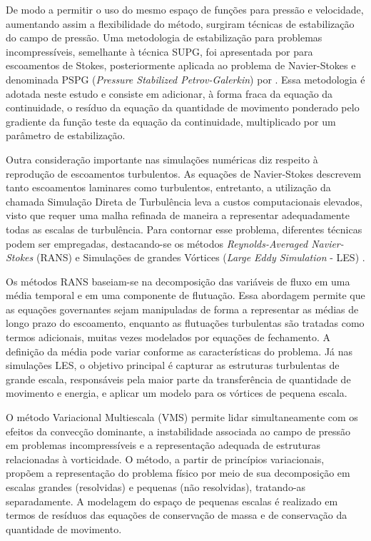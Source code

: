 De modo a permitir o uso do mesmo espaço de funções para pressão e velocidade, aumentando assim a flexibilidade do método, surgiram técnicas de estabilização do campo de pressão. Uma metodologia de estabilização para problemas incompressíveis, semelhante à técnica SUPG, foi apresentada por  para escoamentos de Stokes, posteriormente aplicada ao problema de Navier-Stokes e denominada PSPG (\textit{Pressure Stabilized Petrov-Galerkin}) por . Essa metodologia é adotada neste estudo e consiste em adicionar, à forma fraca da equação da continuidade, o resíduo da equação da quantidade de movimento ponderado pelo gradiente da função teste da equação da continuidade, multiplicado por um parâmetro de estabilização.

Outra consideração importante nas simulações numéricas diz respeito à reprodução de escoamentos turbulentos. As equações de Navier-Stokes descrevem tanto escoamentos laminares como turbulentos, entretanto, a utilização da chamada Simulação Direta de Turbulência leva a custos computacionais elevados, visto que requer uma malha refinada de maneira a representar adequadamente todas as escalas de turbulência. Para contornar esse problema, diferentes técnicas podem ser empregadas, destacando-se os métodos \textit{Reynolds-Averaged Navier-Stokes} (RANS) \cite{Alfonsi2009,Speziale1991} e Simulações de grandes Vórtices (\textit{Large Eddy Simulation} - LES) \cite{Germano1991,LaunderS:1972,PIOMELLI1999,Wilcox:1993}.

Os métodos RANS baseiam-se na decomposição das variáveis de fluxo em uma média temporal e em uma componente de flutuação. Essa abordagem permite que as equações governantes sejam manipuladas de forma a representar as médias de longo prazo do escoamento, enquanto as flutuações turbulentas são tratadas como termos adicionais, muitas vezes modelados por equações de fechamento. A definição da média pode variar conforme as características do problema. Já nas simulações LES, o objetivo principal é capturar as estruturas turbulentas de grande escala, responsáveis pela maior parte da transferência de quantidade de movimento e energia, e aplicar um modelo para os vórtices de pequena escala.

O método Variacional Multiescala (VMS) \cite{BazilevsTT:2013a,Hughes:1995,Hughesetal:1998,Hughesetal:2001} permite lidar simultaneamente com os efeitos da convecção dominante, a instabilidade associada ao campo de pressão em problemas incompressíveis e a representação adequada de estruturas relacionadas à vorticidade. O método, a partir de princípios variacionais, propõem a representação do problema físico por meio de sua decomposição em escalas grandes (resolvidas) e pequenas (não resolvidas), tratando-as separadamente.  A modelagem do espaço de pequenas escalas é realizado em termos de resíduos das equações de conservação de massa e de conservação da quantidade de movimento. 


